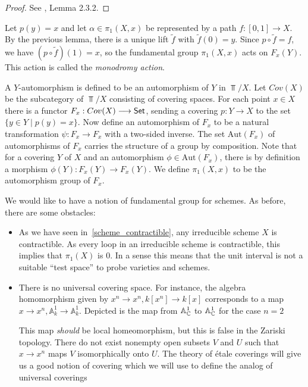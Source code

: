 \begin{proof}
	See \cite{Szamuely}, Lemma 2.3.2.
\end{proof}

\begin{construction}
	Let $p(y)=x$ and let $\alpha \in \pi_1(X,x)$ be represented by a path $f: [0,1] \to X$. By the previous lemma, there is a unique lift $\tilde{f}$ with $\tilde{f}(0) = y$. Since $p \circ \tilde{f} = f$, we have $(p \circ \tilde{f})(1) = x$, so the fundamental group $\pi_1(X, x)$ acts on $F_x(Y)$. This action is called the \textit{monodromy action}.
\end{construction}

A $Y$-automorphism is defined to be an automorphism of $Y$ in $\Top/X$. Let $Cov(X)$ be the subcategory of $\Top/X$ consisting of covering spaces. For each point $x \in X$ there is a functor $F_x: Cov(X) \longrightarrow \mathsf{Set}$, sending a covering $p: Y \to X$ to the set $\{y \in Y \mid p(y) = x\}$. Now define an automorphism of $F_x$ to be a natural transformation $\psi: F_x \to F_x$ with a two-sided inverse. The set $\text{Aut}(F_x)$ of automorphisms of $F_x$ carries the structure of a group by composition. Note that for a covering $Y$ of $X$ and an automorphism $\phi \in \text{Aut}(F_x)$, there is by definition a morphism $\phi(Y): F_x(Y) \to F_x(Y)$. We define $\pi_1(X,x)$ to be the automorphism group of $F_x$.

We would like to have a notion of fundamental group for schemes. As before, there are some obstacles:

\begin{itemize}
	\item As we have seen in~\ref{scheme_contractible}, any irreducible scheme $X$ is contractible. As every loop in an irreducible scheme is contractible, this implies that $\pi_1(X)$ is $0$. In a sense this means that the unit interval is not a suitable ``test space'' to probe varieties and schemes.
	\item There is no universal covering space.
	      For instance, the algebra homomorphism given by $x^n \to x^n, k[x^n] \to k[x]$ corresponds to a map $x \to x^n, \mathbb{A}^1_k \to \mathbb{A}^1_k$. Depicted is the map from $\mathbb{A}^1_{\mathbb{C}}$ to $\mathbb{A}^1_{\mathbb{C}}$ for the case $n=2$


	      This map \textit{should} be local homeomorphism, but this is false in the Zariski topology. There do not exist nonempty open subsets $V$ and $U$ such that $x \to x^n$ maps $V$ isomorphically onto $U$. The theory of \'etale coverings will give us a good notion of covering which we will use to define the analog of universal coverings
\end{itemize}

